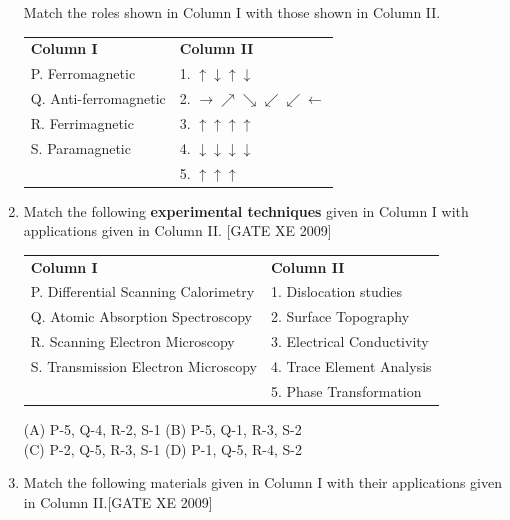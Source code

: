\documentclass[journal,12pt,onecolumn]{IEEEtran}
\theoremstyle{remark}
\begin{document}
\begin{enumerate}
\noindent
Match the roles shown in Column I with those shown in Column II.

\begin{tabular}{@{}p{}p{}@{}}
\textbf{Column I} & \textbf{Column II} \\
P. Ferromagnetic & 1. $\uparrow\downarrow\uparrow\downarrow$ \\
Q. Anti-ferromagnetic & 2. $\rightarrow \nearrow \searrow\swarrow\swarrow \leftarrow$ \\
R. Ferrimagnetic & 3. $\uparrow\uparrow\uparrow\uparrow$ \\
S. Paramagnetic & 4. $\downarrow\downarrow\downarrow\downarrow$ \\
& 5. $\uparrow\uparrow\uparrow$ \\
\end{tabular}



\begin{enumerate}
\end{enumerate}



\item Match the following \textbf{experimental techniques} given in Column I with applications given in Column II.
\hfill[GATE XE 2009]


\begin{tabular}{p{7cm} p{6cm}}
\textbf{Column I} & \textbf{Column II} \\
P. Differential Scanning Calorimetry & 1. Dislocation studies \\
Q. Atomic Absorption Spectroscopy & 2. Surface Topography \\
R. Scanning Electron Microscopy & 3. Electrical Conductivity \\
S. Transmission Electron Microscopy & 4. Trace Element Analysis \\
& 5. Phase Transformation \\
\end{tabular}



\noindent
(A) P-5, Q-4, R-2, S-1 \quad
(B) P-5, Q-1, R-3, S-2 \\
(C) P-2, Q-5, R-3, S-1 \quad
(D) P-1, Q-5, R-4, S-2
\item Match the following materials given in Column I with their applications given in Column II.\hfill[GATE XE 2009]




\end{enumerate}
\end{document}
